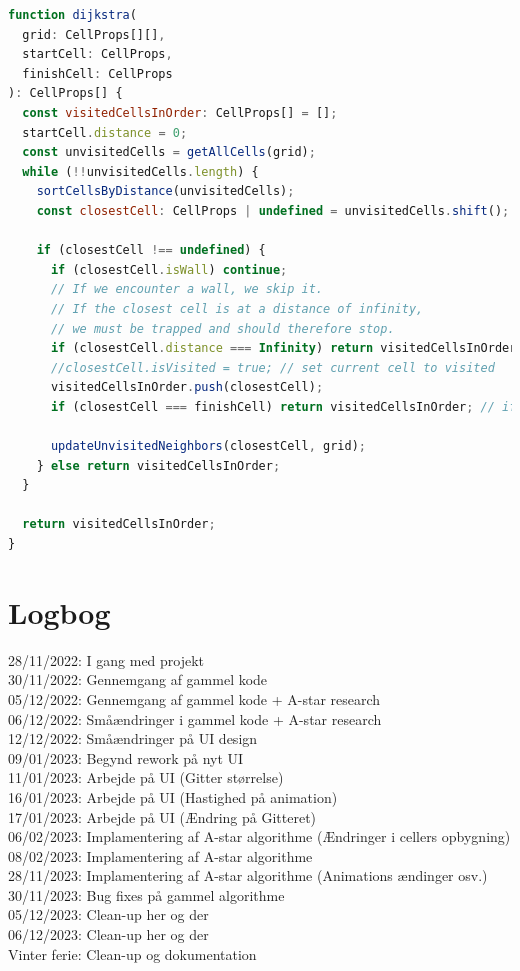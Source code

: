 \documentclass[12pt]{article}
\begin{document}
\begin{lstlisting}[language=JavaScript, caption=Udvalgt kode af Dijkstra's algoritmen, label={lst:Dijkstra}]
function dijkstra(
  grid: CellProps[][],
  startCell: CellProps,
  finishCell: CellProps
): CellProps[] {
  const visitedCellsInOrder: CellProps[] = [];
  startCell.distance = 0;
  const unvisitedCells = getAllCells(grid);
  while (!!unvisitedCells.length) {
    sortCellsByDistance(unvisitedCells);
    const closestCell: CellProps | undefined = unvisitedCells.shift();

    if (closestCell !== undefined) {
      if (closestCell.isWall) continue;
      // If we encounter a wall, we skip it.
      // If the closest cell is at a distance of infinity,
      // we must be trapped and should therefore stop.
      if (closestCell.distance === Infinity) return visitedCellsInOrder;
      //closestCell.isVisited = true; // set current cell to visited
      visitedCellsInOrder.push(closestCell);
      if (closestCell === finishCell) return visitedCellsInOrder; // if reached finishcell

      updateUnvisitedNeighbors(closestCell, grid);
    } else return visitedCellsInOrder;
  }

  return visitedCellsInOrder;
}
\end{lstlisting}

\section*{Logbog}
28/11/2022: I gang med projekt \\
30/11/2022: Gennemgang af gammel kode \\
05/12/2022: Gennemgang af gammel kode + A-star research \\
06/12/2022: Småændringer i gammel kode + A-star research \\
12/12/2022: Småændringer på UI design \\
09/01/2023: Begynd rework på nyt UI \\
11/01/2023: Arbejde på UI (Gitter størrelse) \\
16/01/2023: Arbejde på UI (Hastighed på animation)\\
17/01/2023: Arbejde på UI (Ændring på Gitteret)\\
06/02/2023: Implamentering af A-star algorithme (Ændringer i cellers opbygning) \\
08/02/2023: Implamentering af A-star algorithme \\
28/11/2023: Implamentering af A-star algorithme (Animations ændinger osv.)\\
30/11/2023: Bug fixes på gammel algorithme \\
05/12/2023: Clean-up her og der\\
06/12/2023: Clean-up her og der\\
Vinter ferie: Clean-up og dokumentation \\
\end{document}
